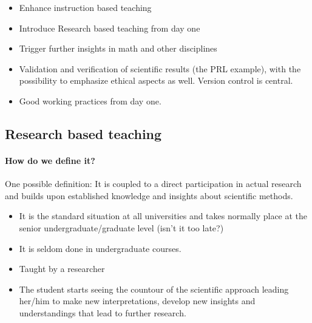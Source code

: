 \documentclass[%
twoside,                 %
final,                   %
10pt]{article}
\begin{document}
\begin{itemize}
\item Enhance instruction based teaching

\item Introduce Research based teaching  from day one

\item Trigger further insights in math and other disciplines 

\item Validation and verification of scientific results (the PRL example), with the possibility to emphasize ethical aspects as well. Version control is central.

\item Good working practices from day one.
\end{itemize}

\noindent





\subsection{Research based teaching}

\paragraph{How do we define it?}
One possible definition: It is coupled to a direct participation in actual research and builds upon established
knowledge and insights about scientific methods.


\begin{itemize}
\item It is the standard situation at all universities  and takes normally place at the senior undergraduate/graduate level (isn't it too late?)

\item It is seldom done in undergraduate courses.

\item Taught by a researcher

\item The student starts seeing the countour of the scientific approach leading her/him to make new interpretations, develop new insights and understandings that lead  to further research.
\end{itemize}

\noindent
\end{document}
